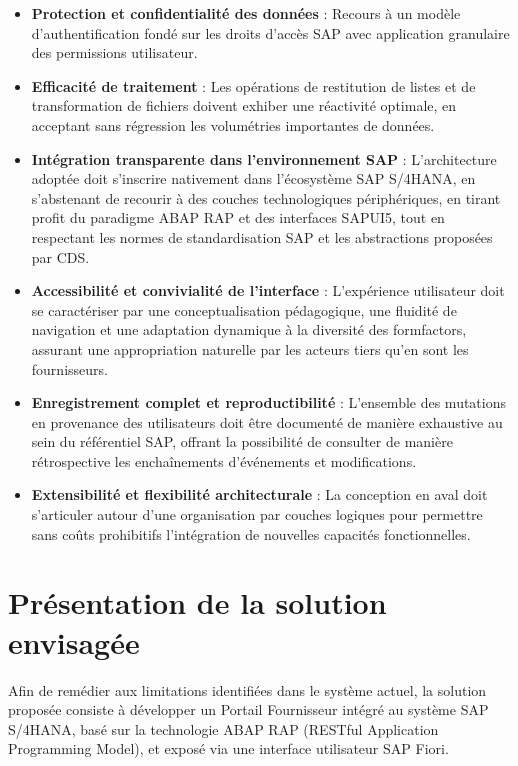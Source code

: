 \documentclass[12pt,a4paper,oneside]{report}
\begin{document}
\begin{itemize}[label=\textbullet, itemsep=0.2em]
  \item \textbf{Protection et confidentialité des données} : Recours à un modèle d'authentification fondé sur les droits d'accès SAP avec application granulaire des permissions utilisateur.
  
  \item \textbf{Efficacité de traitement} : Les opérations de restitution de listes et de transformation de fichiers doivent exhiber une réactivité optimale, en acceptant sans régression les volumétries importantes de données.
  
  \item \textbf{Intégration transparente dans l'environnement SAP} : L'architecture adoptée doit s'inscrire nativement dans l'écosystème SAP S/4HANA, en s'abstenant de recourir à des couches technologiques périphériques, en tirant profit du paradigme ABAP RAP et des interfaces SAPUI5, tout en respectant les normes de standardisation SAP et les abstractions proposées par CDS.
  
  \item \textbf{Accessibilité et convivialité de l'interface} : L'expérience utilisateur doit se caractériser par une conceptualisation pédagogique, une fluidité de navigation et une adaptation dynamique à la diversité des formfactors, assurant une appropriation naturelle par les acteurs tiers qu'en sont les fournisseurs.
  
  \item \textbf{Enregistrement complet et reproductibilité} : L'ensemble des mutations en provenance des utilisateurs doit être documenté de manière exhaustive au sein du référentiel SAP, offrant la possibilité de consulter de manière rétrospective les enchaînements d'événements et modifications.
  
  \item \textbf{Extensibilité et flexibilité architecturale} : La conception en aval doit s'articuler autour d'une organisation par couches logiques pour permettre sans coûts prohibitifs l'intégration de nouvelles capacités fonctionnelles.
\end{itemize}

\section{Présentation de la solution envisagée}\label{ch3:solution}

Afin de remédier aux limitations identifiées dans le système actuel, la solution proposée consiste à développer un Portail Fournisseur intégré au système SAP S/4HANA, basé sur la technologie ABAP RAP (RESTful Application Programming Model), et exposé via une interface utilisateur SAP Fiori.
\end{document}
